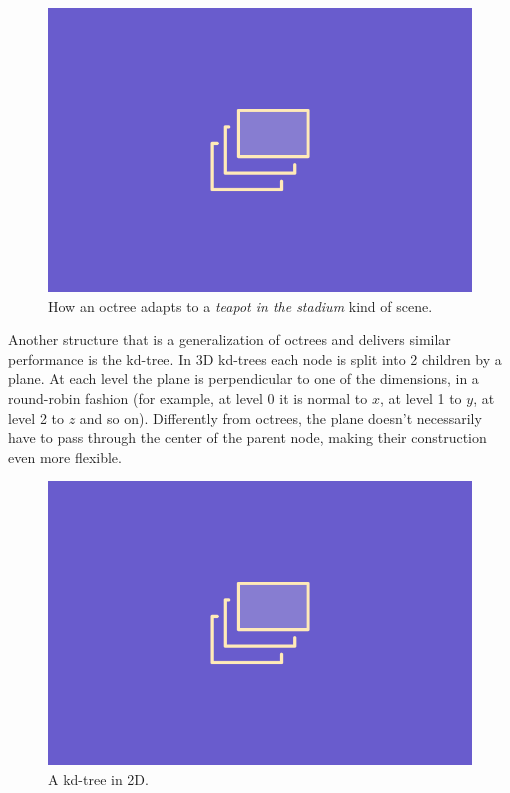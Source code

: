 \documentclass{PoliMi_MasterThesis}
\begin{document}
\begin{figure}[H]
    \centering
    \includegraphics[width=\textwidth*\real{0.6}]{Images/TODO.png}
    \caption{How an octree adapts to a \textit{teapot in the stadium} kind of scene.}
    \label{fig:octree_teapot_stadium}
\end{figure}

Another structure that is a generalization of octrees and delivers similar performance is the kd-tree. In 3D kd-trees each node is split into 2 children by a plane. At each level the plane is perpendicular to one of the dimensions, in a round-robin fashion (for example, at level 0 it is normal to $x$, at level 1 to $y$, at level 2 to $z$ and so on). Differently from octrees, the plane doesn't necessarily have to pass through the center of the parent node, making their construction even more flexible.

\begin{figure}[H]
    \centering
    \includegraphics[width=\textwidth*\real{0.6}]{Images/TODO.png}
    \caption{A kd-tree in 2D.}
    \label{fig:kd_tree}
\end{figure}
\end{document}
